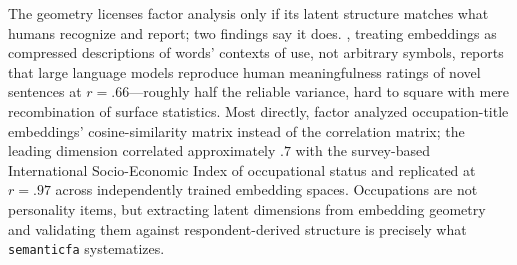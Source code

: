 The geometry licenses factor analysis only if its latent structure matches what humans recognize and report; two findings say it does. \citet{westbury-preprint}, treating embeddings as compressed descriptions of words' contexts of use, not arbitrary symbols, reports that large language models reproduce human meaningfulness ratings of novel sentences at $r = .66$---roughly half the reliable variance, hard to square with mere recombination of surface statistics. Most directly, \citet{kmetty-etal-2021} factor analyzed occupation-title embeddings' cosine-similarity matrix instead of the correlation matrix; the leading dimension correlated approximately $.7$ with the survey-based International Socio-Economic Index of occupational status and replicated at $r = .97$ across independently trained embedding spaces. Occupations are not personality items, but extracting latent dimensions from embedding geometry and validating them against respondent-derived structure is precisely what \texttt{semanticfa} systematizes.
